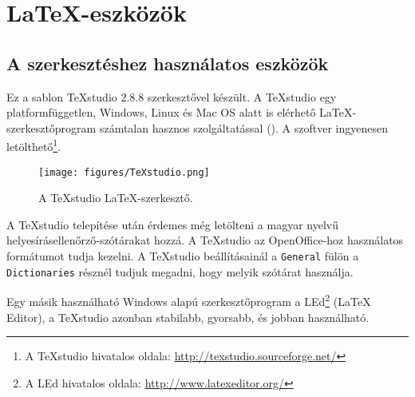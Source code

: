 \chapter{\LaTeX-eszközök}
\label{sec:LatexTools}
\section{A szerkesztéshez használatos eszközök}

Ez a sablon TeXstudio 2.8.8 szerkesztővel készült. A TeXstudio egy platformfüggetlen, Windows, Linux és Mac OS alatt is elérhető \LaTeX-szerkesztőprogram számtalan hasznos szolgáltatással (). A szoftver ingyenesen letölthető\footnote{A TeXstudio hivatalos oldala: \url{http://texstudio.sourceforge.net/}}.

\begin{figure}[!ht]
    \centering
    \texttt{[image: figures/TeXstudio.png]}
    \caption{A TeXstudio \LaTeX-szerkesztő.}
    \label{fig:TeXstudio}
\end{figure}

A TeXstudio telepítése után érdemes még letölteni a magyar nyelvű helyesírásellenőrző-szótárakat hozzá. A TeXstudio az OpenOffice-hoz használatos formátumot tudja kezelni. A TeXstudio beállításainál a \verb+General+ fülön a \verb+Dictionaries+ résznél tudjuk megadni, hogy melyik szótárat használja.

Egy másik használható Windows alapú szerkesztőprogram a LEd\footnote{A LEd hivatalos oldala: \url{http://www.latexeditor.org/}} (LaTeX Editor), a TeXstudio azonban stabilabb, gyorsabb, és jobban használható.


